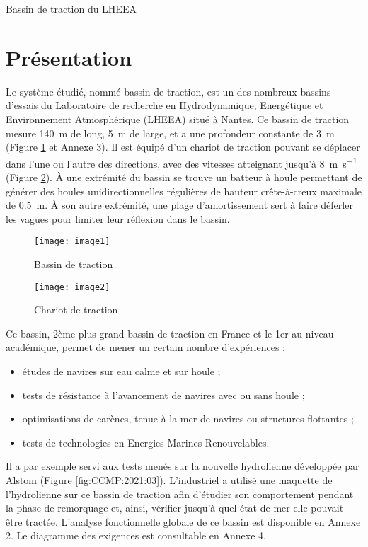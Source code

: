 Bassin de traction du LHEEA

\section{Présentation}
Le système étudié, nommé bassin de traction, est un des nombreux bassins d'essais du Laboratoire de recherche en Hydrodynamique, Energétique et Environnement Atmosphérique (LHEEA) situé à Nantes.
Ce bassin de traction mesure \SI{140}{m} de long, \SI{5}{m} de large, et a une profondeur constante de \SI{3}{m} (Figure \ref{fig:CCMP:2021:01} et Annexe 3). Il est équipé d’un chariot de traction pouvant se déplacer dans l’une ou l’autre des directions, avec des vitesses atteignant jusqu’à \SI{8}{m.s^{-1}} (Figure \ref{fig:CCMP:2021:02}). À une extrémité du bassin se trouve un batteur à houle permettant de générer des houles unidirectionnelles régulières de hauteur crête-à-creux maximale de \SI{0,5}{m}. À son autre extrémité, une plage d’amortissement sert à faire déferler les vagues pour limiter leur réflexion dans le bassin.


\begin{figure}[!h]
\centering
\texttt{[image: image1]}
\caption{ \label{fig:CCMP:2021:01}Bassin de traction}
\end{figure}

\begin{figure}[!h]
\centering
\texttt{[image: image2]}
\caption{ \label{fig:CCMP:2021:02} Chariot de traction}
\end{figure} 

Ce bassin, 2ème plus grand bassin de traction en France et le 1er au niveau académique, permet de mener un certain nombre d’expériences :
\begin{itemize}
	\item études de navires sur eau calme et sur houle ;
	\item tests de résistance à l'avancement de navires avec ou sans houle ;
	\item optimisations de carènes, tenue à la mer de navires ou structures flottantes ;
	\item tests de technologies en Energies Marines Renouvelables.
\end{itemize}
 
Il a par exemple servi aux tests menés sur la nouvelle hydrolienne développée par Alstom (Figure \ref{fig:CCMP:2021:03}).
L’industriel a utilisé une maquette de l’hydrolienne sur ce bassin de traction afin d’étudier son comportement pendant la phase de remorquage et, ainsi, vérifier jusqu’à quel état de mer elle pouvait être tractée.
L’analyse fonctionnelle globale de ce bassin est disponible en Annexe 2. Le diagramme des exigences est consultable en Annexe 4.
 
